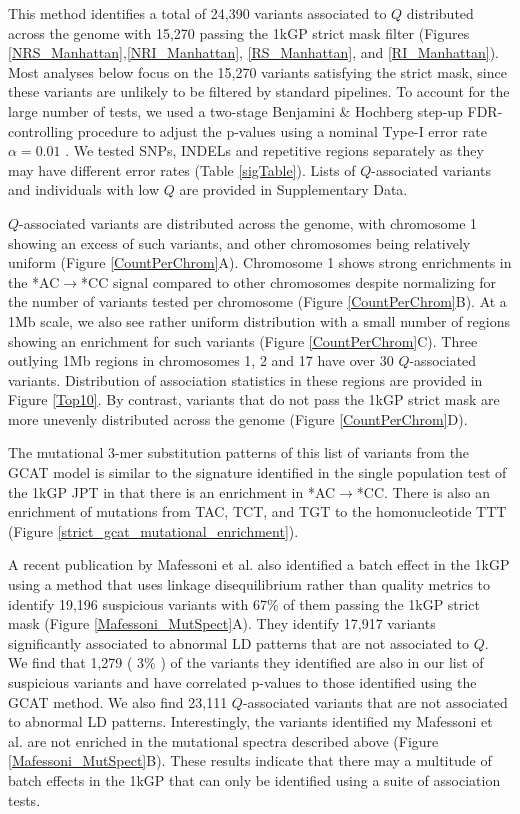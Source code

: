 \documentclass[9pt,article]{template}
\begin{document}
This method identifies a total of 24,390 variants associated to $Q$ distributed across the genome with 15,270 passing the 1kGP strict mask filter (Figures \ref{NRS_Manhattan},\ref{NRI_Manhattan}, \ref{RS_Manhattan}, and \ref{RI_Manhattan}). Most analyses below focus on the 15,270 variants satisfying the strict mask, since these variants are unlikely to be filtered by standard pipelines.
To account for the large number of tests, we used a two-stage Benjamini \& Hochberg step-up FDR-controlling procedure to adjust the p-values using a nominal Type-I error rate $\alpha = 0.01$ \citep{Benjamini2006}. 
We tested SNPs, INDELs and repetitive regions separately as they may have different error rates (Table \ref{sigTable}).
Lists of $Q$-associated variants and individuals with low $Q$ are provided in Supplementary Data.

$Q$-associated variants are distributed across the genome, with chromosome 1 showing an excess of such variants, and other chromosomes being relatively uniform (Figure \ref{CountPerChrom}A).
Chromosome 1 shows strong enrichments in the  *AC${\rightarrow}$*CC signal compared to other chromosomes despite normalizing for the number of variants tested per chromosome (Figure \ref{CountPerChrom}B).
At a 1Mb scale, we also see rather uniform distribution with a small number of regions showing an enrichment for such variants (Figure \ref{CountPerChrom}C).
Three outlying 1Mb regions in chromosomes 1, 2 and 17 have over 30 $Q$-associated variants.
Distribution of association statistics in these regions are provided in Figure \ref{Top10}.
By contrast, variants that do not pass the 1kGP strict mask are more unevenly distributed across the genome (Figure \ref{CountPerChrom}D).

The mutational 3-mer substitution patterns of this list of variants from the GCAT model is similar to the signature identified in the single population test of the 1kGP JPT in that there is an enrichment in *AC${\rightarrow}$*CC.
There is also an enrichment of mutations from TAC, TCT, and TGT to the homonucleotide TTT (Figure \ref{strict_gcat_mutational_enrichment}).


A recent publication by Mafessoni et al. also identified a batch effect in the 1kGP using a method that uses linkage disequilibrium rather than quality metrics to identify 19,196 suspicious variants with 67\% of them passing the 1kGP strict mask \citep{mafessoni2018turning} (Figure \ref{Mafessoni_MutSpect}A).
They identify 17,917 variants significantly associated to abnormal LD patterns that are not associated to $Q$.
We find that 1,279 ( 3\% ) of the variants they identified are also in our list of suspicious variants and have correlated p-values to those identified using the GCAT method.
We also find 23,111 $Q$-associated variants that are not associated to abnormal LD patterns. 
Interestingly, the variants identified my Mafessoni et al. are not enriched in the mutational spectra described above (Figure \ref{Mafessoni_MutSpect}B).
These results indicate that there may a multitude of batch effects in the 1kGP that can only be identified using a suite of association tests.
\end{document}
